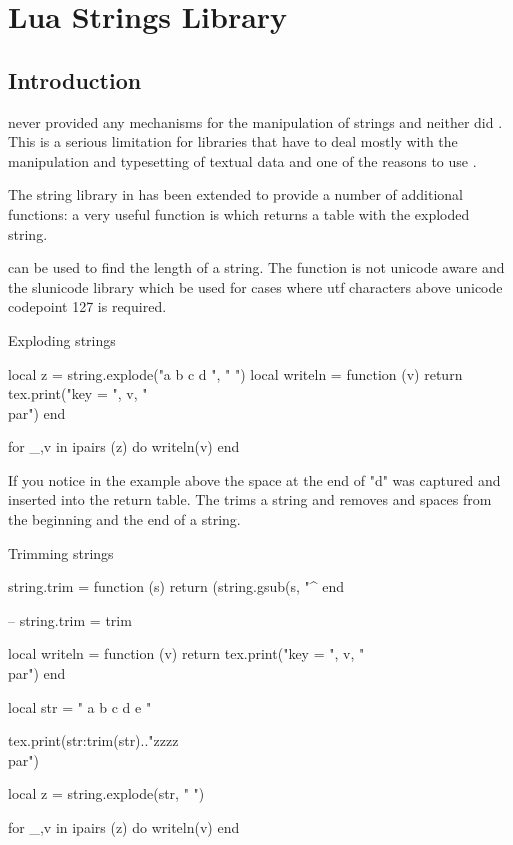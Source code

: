 \chapter{Lua Strings Library}

\section{Introduction}


\tex never provided any mechanisms for the manipulation of strings and neither did \latex. This is a serious limitation for libraries that have to deal mostly with the manipulation and typesetting of textual data and one of the reasons to use \LUA. 

The \LUA string library in \LUA\tex has been extended to provide a number of additional functions: a very useful function is  which returns a table with the exploded string. 


 can be used to find the length of a string.
The  function is not unicode aware and the slunicode library which be used for cases where utf characters above unicode codepoint 127 is required.

\begin{texexample}{Exploding strings}{}
\begin{luacode}
local z = string.explode("a b c d ", " ")
local   writeln = function (v) 
   return   tex.print("key = ", v, "\\par")
end

for _,v in ipairs (z) do
  writeln(v)
end
\end{luacode}
\end{texexample}

If you notice in the example above the space at the end of "d" was captured and inserted into the return table. The  trims a string and removes and spaces from the beginning and the end of a string.

\begin{texexample}{Trimming strings}{}
\begin{luacode*}


string.trim = function (s)
   return (string.gsub(s, "^%
end

-- string.trim = trim

local  writeln = function (v) 
   return   tex.print("key = ", v, "\\par")
end

local str = " a b c d e "

tex.print(str:trim(str).."zzzz\\par")

local z = string.explode(str, " ")
  
for _,v in ipairs (z) do
  writeln(v)
end
\end{luacode*}
\end{texexample}

